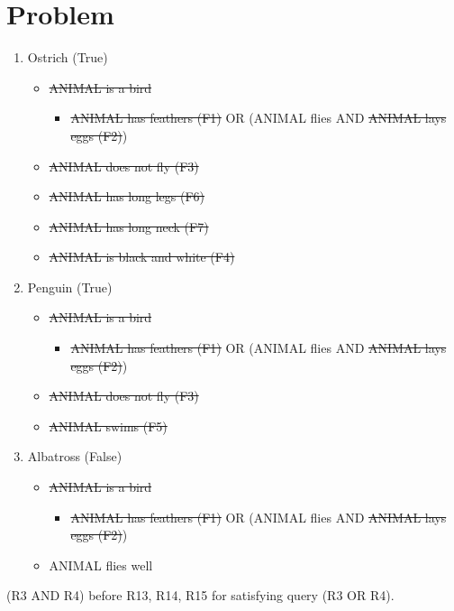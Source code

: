 \documentclass[11pt, oneside]{article}      %
\begin{document}
\section {Problem}
\begin{enumerate}[1. ] %
  \item Ostrich (True)
    \begin{itemize}
      \item \sout{ANIMAL is a bird}
        \begin{itemize}
          \item \sout{ANIMAL has feathers (F1)} OR (ANIMAL flies AND \sout{ANIMAL lays eggs (F2)})
        \end{itemize}
      \item \sout{ANIMAL does not fly (F3)}
      \item \sout{ANIMAL has long legs (F6)}
      \item \sout{ANIMAL has long neck (F7)}
      \item \sout{ANIMAL is black and white (F4)}
    \end{itemize}
  \item Penguin (True)
    \begin{itemize}
      \item \sout{ANIMAL is a bird}
        \begin{itemize}
          \item \sout{ANIMAL has feathers (F1)} OR (ANIMAL flies AND \sout{ANIMAL lays eggs (F2)})
        \end{itemize}
      \item \sout{ANIMAL does not fly (F3)}
      \item \sout{ANIMAL swims (F5)}
    \end{itemize}
  \item Albatross (False)
    \begin{itemize}
      \item \sout{ANIMAL is a bird}
        \begin{itemize}
          \item \sout{ANIMAL has feathers (F1)} OR (ANIMAL flies AND \sout{ANIMAL lays eggs (F2)})
        \end{itemize}
      \item ANIMAL flies well
    \end{itemize}
\end{enumerate}

(R3 AND R4) before R13, R14, R15 for satisfying query (R3 OR R4). \\
\end{document}
